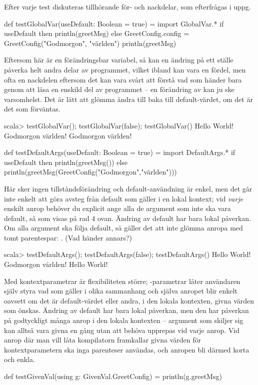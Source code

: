 \noindent Efter varje test diskuteras tillhörande för- och nackdelar, som efterfrågas i uppg. \SubtaskSolved

\begin{Code}
def testGlobalVar(useDefault: Boolean = true) = 
  import GlobalVar.*
  if useDefault then println(greetMsg) else 
    GreetConfig.config = GreetConfig("Godmorgon", "världen")
    println(greetMsg)
\end{Code}
Eftersom  här är en förändringsbar variabel, så kan en ändring på ett ställe påverka helt andra delar av programmet, vilket ibland kan vara en fördel, men ofta en nackdelen eftersom det kan vara svårt att förstå vad som händer bara genom att läsa en enskild del av programmet -- en förändring av  kan ju ske varsomhelst. Det är lätt att glömma ändra till baka till default-värdet, om det är det som förväntas.
\begin{REPL}
scala> testGlobalVar(); testGlobalVar(false); testGlobalVar()
Hello World!
Godmorgon världen!
Godmorgon världen!
\end{REPL}

\begin{Code}[numbers=left]
def testDefaultArgs(useDefault: Boolean = true) =
  import DefaultArgs.*
  if useDefault then println(greetMsg()) else 
    println(greetMsg(GreetConfig("Godmorgon","världen")))
\end{Code}
Här sker ingen tillståndsförändring och default-användning är enkel, men det går inte enkelt att göra avsteg från default som  gäller i en lokal kontext; vid \emph{varje} enskilt anrop behöver du explicit ange alla de argument som inte ska vara default, så som visas på rad 4 ovan. Ändring av default har bara lokal påverkan. Om alla argument ska följa default, så gäller det att inte glömma anropa med tomt parentespar: . (Vad händer annars?)
\begin{REPL}
scala> testDefaultArgs(); testDefaultArgs(false); testDefaultArgs()
Hello World!
Godmorgon världen!
Hello World!
\end{REPL}
Med kontextparametrar är flexibiliteten större; -parametrar låter användaren själv styra vad som gäller i olika sammanhang och själva anropet blir enkelt oavsett om det är default-värdet eller andra, i den lokala kontexten, givna värden som önskas. Ändring av default har bara lokal påverkan, men den har påverkan på godtyckligt många anrop i den lokala kontexten --  argument som skiljer sig kan alltså vara givna en gång utan att behöva upprepas vid varje anrop. Vid anrop där man vill låta kompilatorn framkallar givna värden för kontextparametern ska inga parenteser användas, och anropen bli därmed korta och enkla.
\begin{Code}
def testGivenVal(using g: GivenVal.GreetConfig) = println(g.greetMsg)
\end{Code}

